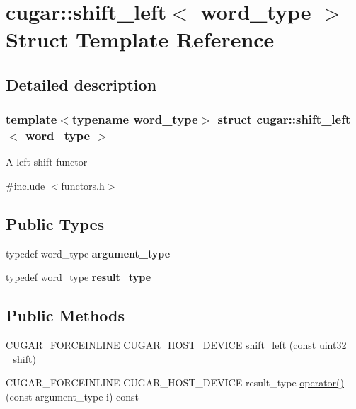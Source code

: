 \hypertarget{structcugar_1_1shift__left}{}\section{cugar\+:\+:shift\+\_\+left$<$ word\+\_\+type $>$ Struct Template Reference}
\label{structcugar_1_1shift__left}


\subsection{Detailed description}
\subsubsection*{template$<$typename word\+\_\+type$>$\newline
struct cugar\+::shift\+\_\+left$<$ word\+\_\+type $>$}

A left shift functor 

{\ttfamily \#include $<$functors.\+h$>$}

\subsection*{Public Types}
\begin{DoxyCompactItemize}
\item 
\mbox{\label{structcugar_1_1shift__left_a5b064aae63e2607b7dfa94f76c1760e2}} 
typedef word\+\_\+type {\bfseries argument\+\_\+type}
\item 
\mbox{\label{structcugar_1_1shift__left_a05e9b170d7600e8f0ee664f5a967bbdf}} 
typedef word\+\_\+type {\bfseries result\+\_\+type}
\end{DoxyCompactItemize}
\subsection*{Public Methods}
\begin{DoxyCompactItemize}
\item 
C\+U\+G\+A\+R\+\_\+\+F\+O\+R\+C\+E\+I\+N\+L\+I\+NE C\+U\+G\+A\+R\+\_\+\+H\+O\+S\+T\+\_\+\+D\+E\+V\+I\+CE \hyperlink{structcugar_1_1shift__left_ac08dd371669fbc3edc074da446fe43ed}{shift\+\_\+left} (const uint32 \+\_\+shift)
\item 
C\+U\+G\+A\+R\+\_\+\+F\+O\+R\+C\+E\+I\+N\+L\+I\+NE C\+U\+G\+A\+R\+\_\+\+H\+O\+S\+T\+\_\+\+D\+E\+V\+I\+CE result\+\_\+type \hyperlink{structcugar_1_1shift__left_a2ae090773d0a7f31c926cf1331163bf1}{operator()} (const argument\+\_\+type i) const
\end{DoxyCompactItemize}
